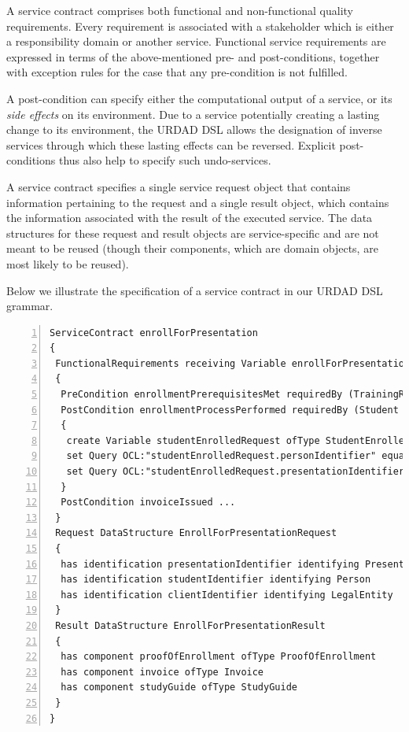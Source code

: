A service contract comprises both functional and non-functional quality requirements. Every requirement is associated with a stakeholder which is either a responsibility domain or another service. Functional service requirements are expressed in terms of the above-mentioned pre- and post-conditions, together with exception rules for the case that any pre-condition is not fulfilled. 

A post-condition can specify either the computational output of a service, or its \emph{side effects} on its environment. Due to a service potentially creating a lasting change to its environment, the URDAD DSL allows the designation of inverse services through which these lasting effects can be reversed. Explicit post-conditions thus also help to specify such undo-services.

A service contract specifies a single service request object that contains information pertaining to the request and a single result object, which contains the information associated with the result of the executed service. The data structures for these request and result objects are service-specific and are not meant to be reused (though their components, which are domain objects, are most likely to be reused). 

Below we illustrate the specification of a service contract in our URDAD DSL grammar.
\lstset{language=urdad,caption=Specifying a service contract in the textual URDAD DSL syntax.,label=contractTextSyntax}
\begin{lstlisting}[numbers=left,escapechar=|]
ServiceContract enrollForPresentation
{
 FunctionalRequirements receiving Variable enrollForPresentationRequest ofType EnrollForPresentationRequest
 {
  PreCondition enrollmentPrerequisitesMet requiredBy (TrainingRegulator Student) raises EnrollmentPrerequisitesNotSatisfiedException checks constraint enrollmentPrerequisitesForPresentationMet with ValueOf enrollForPresentationRequest
  PostCondition enrollmentProcessPerformed requiredBy (Student Client TrainingRegulator) ensures constraint studentEnrolledForPresentation          with ValueOf studentEnrolledRequest constructedUsing doSequential
  {
   create Variable studentEnrolledRequest ofType StudentEnrolledRequest
   set Query OCL:"studentEnrolledRequest.personIdentifier" equalTo Query OCL:"enrollForPresentationRequest.personIdentifier"                            
   set Query OCL:"studentEnrolledRequest.presentationIdentifier" equalTo Query OCL:"enrollForPresentationRequest.presentationIdentifier"                            
  }  
  PostCondition invoiceIssued ...
 }            
 Request DataStructure EnrollForPresentationRequest 
 {
  has identification presentationIdentifier identifying Presentation
  has identification studentIdentifier identifying Person
  has identification clientIdentifier identifying LegalEntity         
 }
 Result DataStructure EnrollForPresentationResult 
 {
  has component proofOfEnrollment ofType ProofOfEnrollment
  has component invoice ofType Invoice
  has component studyGuide ofType StudyGuide
 }
}
\end{lstlisting}


